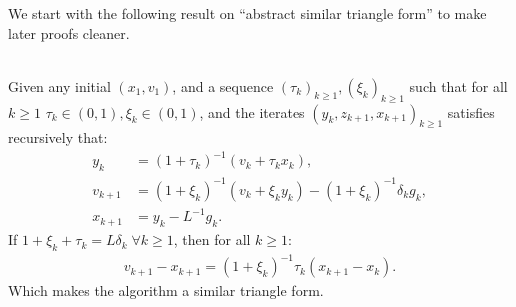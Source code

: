 \documentclass[12pt]{article}
\begin{document}
    We start with the following result on ``abstract similar triangle form'' to make later proofs cleaner.
    \begin{proposition}\label{prop:abs-st-form}\;\\
        Given any initial $(x_1, v_1)$, and a sequence $(\tau_k)_{k \ge 1}, (\xi_k)_{k \ge 1}$ such that for all $k \ge 1$ $\tau_k \in (0, 1), \xi_k \in (0, 1)$, and the iterates $(y_k, z_{k + 1}, x_{k + 1})_{k \ge 1}$ satisfies recursively that:
        \begin{align*}
            y_k &= (1 + \tau_k)^{-1}(v_k + \tau_k x_k),
            \\
            v_{k + 1} &= (1 + \xi_k)^{-1}(v_k + \xi_k y_k) - (1 + \xi_k)^{-1}\delta_k g_k,
            \\
            x_{k + 1} &= y_k - L^{-1} g_k.
        \end{align*}
        If $1 + \xi_k + \tau_k = L\delta_k\; \forall k \ge 1$, then for all $k \ge 1$:
        \begin{align}\label{eqn:abs-st-key}
            v_{k + 1} - x_{k + 1} = (1 + \xi_k)^{-1}\tau_k(x_{k + 1} - x_k).
        \end{align}
        Which makes the algorithm a similar triangle form.
    \end{proposition}
\end{document}
